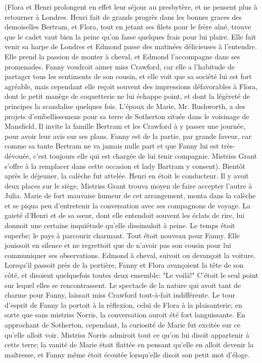 (Flora et Henri prolongent en effet leur\setcounter{page}{511} séjour au presbytère, et ne pensent plus à retourner à Londres.
Henri fait de grands progrès dans les bonnes graces des demoiselles Bertram, et Flora, tout en jetant ses filets pour le frère aîné, trouve que le cadet vaut bien la peine qu'on fasse quelques frais pour lui plaire. Elle fait venir sa harpe de Londres et Edmond passe des matinées délicieuses à l'entendre. Elle prend la passion de monter à cheval, et Edmond l'accompagne dans ses promenades.
Fanny voudroit aimer miss Crawford, car elle a l'habitude de partager tous les sentiments de son cousin, et elle voit que sa société lui est fort agréable, mais cependant elle reçoit souvent des impressions défavorables à Flora, dont le petit manège de coquetterie ne lui échappe point, et dont la légèreté de principes la scandalise quelques fois.
L'époux de Marie, Mr. Rushworth, a des projets d'embellissemens pour sa terre de Sotherton située dans le voisinage de Mansfield. Il invite la famille Bertram et les Crawford à y passer une journée, pour avoir leur avis sur ses plans.
Fanny est de la partie, par grande faveur, car comme sa tante Bertram ne va jamais\setcounter{page}{512} nulle part et que Fanny lui est très-dévouée, c'est toujours elle qui est chargée de lui tenir compagnie. Mistriss Grant s'offre à la remplacer dans cette occasion et lady Bartram y consent).
Bientôt après le déjeuner, la calèche fut attelée. Henri en étoit le conducteur. Il y avoit deux places sur le siège, Mistriss Grant trouva moyen de faire accepter l'autre à Julia. Marie de fort mauvaise humeur de cet arrangement, monta dans la calèche et se piqua peu d'entretenir la conversation avec ses compagnons de voyage. La gaieté d'Henri et de sa sœur, dont elle entendoit souvent les éclats de rire, lui donnoit une certaine inquiétude qu'elle dissimuloit à peine.
Le temps étoit superbe; le pays à parcourir charmant. Tout étoit nouveau pour Fanny. Elle jouissoit en silence et ne regrettoit que de n'avoir pas son cousin pour lui communiquer ses observations. Edmond à cheval, suivoit ou devançoit la voiture. Lorsqu'il passoit près de la portière, Fanny et Flora avançoient la tête de son côté, et disoient quelquefois toutes deux ensemble: "Le voilà!" C'étoit le seul point sur lequel elles se rencontrassent. Le spectacle de la nature qui avoit tant de charme pour Fanny,\setcounter{page}{513} laissait miss Crawford tout-à-fait indifférente. Le tour d'esprit de Fanny la portoit à la réflexion, celui de Flora à la plaisanterie; en sorte que sans mistriss Norris, la conversation auroit été fort languissante. En approchant de Sotherton, cependant, la curiosité de Marie fut excitée sur ce qu'elle alloit voir. Mistriss Norris admiroit tout ce qu'on lui disoit appartenir à cette terre; la vanité de Marie étoit flattée en pensant qu'elle en alloit devenir la maîtresse, et Fanny même étoit écoutée lorsqu'elle disoit son petit mot d'éloge.

